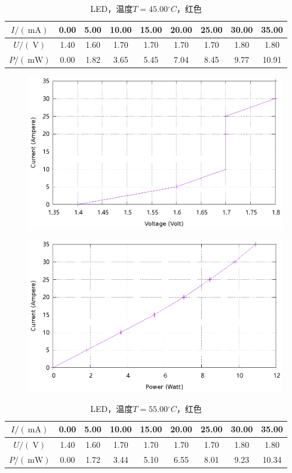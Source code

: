 \documentclass{ctexart}
\newcommand{\si}[1]{\  \mathrm{#1}}
\begin{document}
\newpage
\begin{table}[H]
    \centering
    \begin{tabular}{|c|c|c|c|c|c|c|c|c|}
        \hline
        $I/(\si{mA})$ & 0.00 & 5.00 & 10.00 & 15.00 & 20.00 & 25.00 & 30.00 & 35.00 \\\hline
        $U / (\si{V})$  & 1.40 & 1.60 & 1.70 & 1.70 & 1.70 & 1.70 & 1.80 & 1.80 \\\hline
        $P / (\si{mW})$ & 0.00 & 1.82 & 3.65 & 5.45 & 7.04 & 8.45 & 9.77 & 10.91 \\\hline
    \end{tabular}
    \caption{LED，温度$T=45.00{}^{\circ}C$，红色}
\end{table}
\begin{figure}[H]
    \centering
    \includegraphics[width=0.9\linewidth]{../output/led-vc-6.gnuplot}
\end{figure}
\begin{figure}[H]
    \centering
    \includegraphics[width=0.9\linewidth]{../output/led-pc-6.gnuplot}
\end{figure}
\newpage
\begin{table}[H]
    \centering
    \begin{tabular}{|c|c|c|c|c|c|c|c|c|}
        \hline
        $I/(\si{mA})$ & 0.00 & 5.00 & 10.00 & 15.00 & 20.00 & 25.00 & 30.00 & 35.00 \\\hline
        $U / (\si{V})$  & 1.40 & 1.60 & 1.70 & 1.70 & 1.70 & 1.70 & 1.80 & 1.80 \\\hline
        $P / (\si{mW})$ & 0.00 & 1.72 & 3.44 & 5.10 & 6.55 & 8.01 & 9.23 & 10.34 \\\hline
    \end{tabular}
    \caption{LED，温度$T=55.00{}^{\circ}C$，红色}
\end{table}
\end{document}
